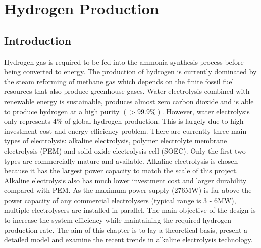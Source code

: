 


% 

\section{Hydrogen Production}
\subsection{Introduction} 


Hydrogen gas is required to be fed into the ammonia synthesis process before being converted to energy. The production of hydrogen is currently dominated by the steam reforming of methane gas which depends on the finite fossil fuel resources that also produce greenhouse gases. Water electrolysis combined with renewable energy is sustainable, produces almost zero carbon dioxide and is able to produce hydrogen at a high purity $(>99.9\%)$. However, water electrolysis only represents 4\% of global hydrogen production.\cite{reversible} This is largely due to high investment cost and energy efficiency problem. There are currently three main types of electrolysis: alkaline electrolysis, polymer electrolyte membrane electrolysis (PEM) and solid oxide electrolysis cell (SOEC). Only the first two types are commercially mature and available. Alkaline electrolysis is chosen because it has the largest power capacity to match the scale of this project. Alkaline electrolysis also has much lower investment cost and larger durability compared with PEM. As the maximum power supply (276MW) is far above the power capacity of any commercial electrolysers (typical range is 3 - 6MW\cite{gibbs}), multiple electrolysers are installed in parallel.
The main objective of the design is to increase the system efficiency while maintaining the required hydrogen production rate. The aim of this chapter is to lay a theoretical basis, present a detailed model  and examine the recent trends in alkaline electrolysis technology. 

